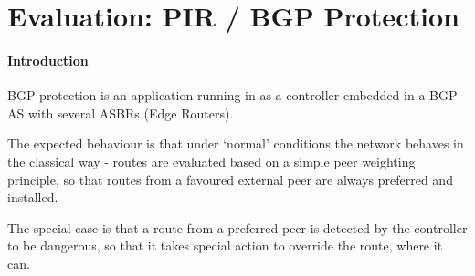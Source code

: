 






\section{Evaluation: PIR / BGP Protection}

\paragraph{Introduction}

BGP protection is an application running in \hbgp as a controller embedded in a BGP AS with several ASBRs (Edge Routers).

The expected behaviour is that under `normal' conditions the network behaves in the classical way - routes are evaluated based on a simple peer weighting principle, so that routes from a favoured external peer are always preferred and installed.

The special case is that a route from a preferred peer is detected by the \hbgp controller to be dangerous, so that it takes special action to override the route, where it can.

